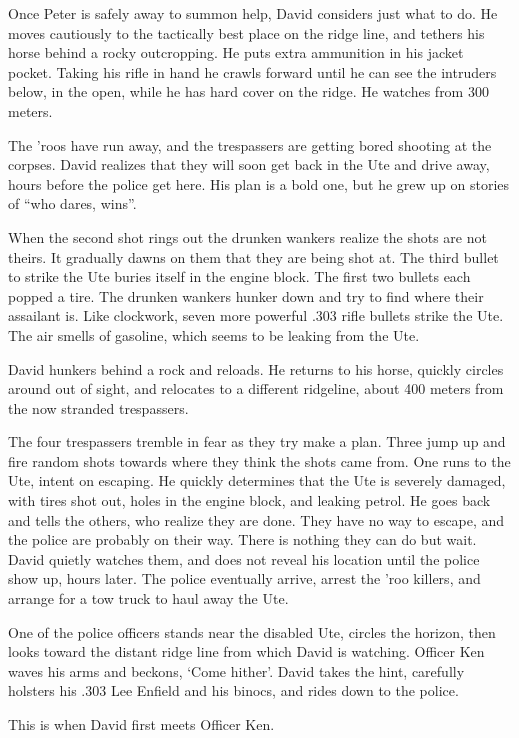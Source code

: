 Once Peter is safely away to summon help, David considers just what to do.  He moves cautiously to the tactically best place on the ridge line, and tethers his horse behind a rocky outcropping.  He puts extra ammunition in his jacket pocket.  Taking his rifle in hand he crawls forward until he can see the intruders below, in the open, while he has hard cover on the ridge.  He watches from 300 meters.

The 'roos have run away, and the trespassers are getting bored shooting at the corpses.  David realizes that they will soon get back in the Ute and drive away, hours before the police get here.  His plan is a bold one, but he grew up on stories of ``who dares, wins''.

When the second shot rings out the drunken wankers realize the shots are not theirs.  It gradually dawns on them that they are being shot at.  The third bullet to strike the Ute buries itself in the engine block.  The first two bullets each popped a tire.  The drunken wankers hunker down and try to find where their assailant is.  Like clockwork, seven more powerful .303 rifle bullets strike the Ute.   The air smells of gasoline, which seems to be leaking from the Ute.

David hunkers behind a rock and reloads.  He returns to his horse, quickly circles around out of sight, and relocates to a different ridgeline, about 400 meters from the now stranded trespassers.

The four trespassers tremble in fear as they try make a plan.  Three jump up and fire random shots towards where they think the shots came from.  One runs to the Ute, intent on escaping.  He quickly determines that the Ute is severely damaged, with tires shot out, holes in the engine block, and leaking petrol.   He goes back and tells the others, who realize they are done.  They have no way to escape, and the police are probably on their way.  There is nothing they can do but wait.  David quietly watches them, and does not reveal his location until the police show up, hours later.  The police eventually arrive, arrest the 'roo killers, and arrange for a tow truck to haul away the Ute.

One of the police officers stands near the disabled Ute, circles the horizon, then looks toward the distant ridge line from which David is watching.  Officer Ken waves his arms and beckons, `Come hither'.  David takes the hint, carefully holsters his .303 Lee Enfield and his binocs, and rides down to the police.

This is when David first meets Officer Ken.

